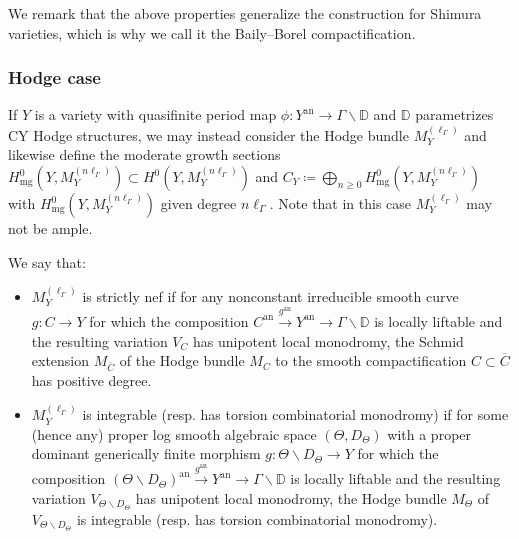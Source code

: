 \documentclass{amsart}
\newcommand{\bs}{\backslash}
\newcommand{\an}{\operatorname{an}}
\newcommand{\ol}{\overline}
\theoremstyle{definition}
\theoremstyle{remark}
\def\bD{\mathbb{D}}
\def\an{\mathrm{an}}
\def\bdd{\mathrm{mg}}
\renewcommand{\bar}[1]{\ol{#1}}
\numberwithin{equation}{section}
\def\testsp{\Theta}
\begin{document}
We remark that the above properties generalize the construction for Shimura varieties, which is why we call it the Baily--Borel compactification. 
\def\Hod{H}

\subsubsection{Hodge case}  If $Y$ is a variety with quasifinite period map $\phi:Y^\an\to \Gamma\bs \bD$ and $\bD$ parametrizes CY Hodge structures, we may instead consider the Hodge bundle $M_Y^{(\ell_\Gamma)}$ and likewise define the moderate growth sections $H^0_{\bdd}(Y,M_Y^{(n\ell_\Gamma)})\subset H^0(Y,M_Y^{(n\ell_\Gamma)})$ and $C_Y\coloneqq  \bigoplus_{n\geq 0}H^0_{\bdd}(Y,M_Y^{(n\ell_\Gamma)})$ with $H^0_{\bdd}(Y,M_Y^{(n\ell_\Gamma)})$ given degree $n\ell_\Gamma$.  Note that in this case $M_Y^{(\ell_\Gamma)}$ may not be ample.

We say that:
\begin{itemize}
\item $M_{Y}^{(\ell_\Gamma)}$ is strictly nef if for any nonconstant irreducible smooth curve $g:C\to Y$ for which the composition $C^\an\xrightarrow{g^\an} Y^\an\to \Gamma\bs \bD$ is locally liftable and the resulting variation $V_C$ has unipotent local monodromy, the Schmid extension $M_{\bar C}$ of the Hodge bundle $M_C$ to the smooth compactification $C\subset\bar C$ has positive degree.
\item $M_Y^{(\ell_\Gamma)}$ is integrable (resp. has torsion combinatorial monodromy) if for some (hence any) proper log smooth algebraic space $(\testsp,D_\testsp)$ with a proper dominant generically finite morphism $g:\testsp\bs D_\testsp\to Y$ for which the composition $(\testsp\bs D_\testsp)^\an\xrightarrow{g^\an} Y^\an\to \Gamma\bs \bD$ is locally liftable and the resulting variation $V_{\testsp \bs D_\testsp}$ has unipotent local monodromy, the Hodge bundle $M_{\testsp}$ of $V_{\testsp\bs D_\testsp}$ is integrable (resp. has torsion combinatorial monodromy). 
\end{itemize}
\end{document}
